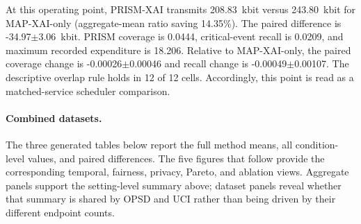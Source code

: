 At this operating point, PRISM-XAI transmits 208.83~kbit versus 243.80~kbit for MAP-XAI-only (aggregate-mean ratio saving 14.35\%). The paired difference is -34.97$\pm$3.06~kbit. PRISM coverage is 0.0444, critical-event recall is 0.0209, and maximum recorded expenditure is 18.206. Relative to MAP-XAI-only, the paired coverage change is -0.00026$\pm$0.00046 and recall change is -0.00049$\pm$0.00107. The descriptive overlap rule holds in 12 of 12 cells. Accordingly, this point is read as a matched-service scheduler comparison.

\paragraph{Combined datasets.} The three generated tables below report the full method means, all condition-level values, and paired differences. The five figures that follow provide the corresponding temporal, fairness, privacy, Pareto, and ablation views. Aggregate panels support the setting-level summary above; dataset panels reveal whether that summary is shared by OPSD and UCI rather than being driven by their different endpoint counts.

\begin{table}[p]\centering\tiny

\caption{Public-score threshold $\tau=0.5$, release cap $M=8$, Combined datasets: complete generated method table.}

\label{tab:thr_0.5_cap_8:combined:main}

\resizebox{\linewidth}{!}{}

\end{table}\clearpage

\begin{table}[p]\centering\tiny

\caption{Public-score threshold $\tau=0.5$, release cap $M=8$, Combined datasets: complete condition-level generated table.}

\label{tab:thr_0.5_cap_8:combined:conditions}

\resizebox{\textwidth}{!}{}

\end{table}\clearpage

\begin{table}[p]\centering\tiny

\caption{Public-score threshold $\tau=0.5$, release cap $M=8$, Combined datasets: complete generated paired comparisons.}

\label{tab:thr_0.5_cap_8:combined:paired}

\resizebox{\textwidth}{!}{}

\end{table}\clearpage

